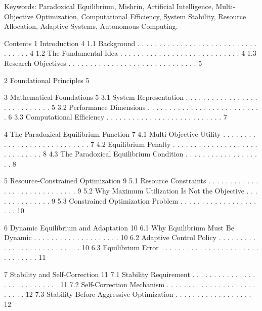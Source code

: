 \documentclass[10pt,a4paper]{article}
\begin{document}
\begin{ManuscriptText}
Keywords: Paradoxical Equilibrium, Mishrin, Artificial Intelligence, Multi-Objective
Optimization, Computational Efficiency, System Stability, Resource Allocation, Adaptive
Systems, Autonomous Computing.


Contents
1 Introduction                                                                          4
  1.1 Background . . . . . . . . . . . . . . . . . . . . . . . . . . . . . . . . . .    4
  1.2 The Fundamental Idea . . . . . . . . . . . . . . . . . . . . . . . . . . . .      4
  1.3 Research Objectives . . . . . . . . . . . . . . . . . . . . . . . . . . . . . .   5

2 Foundational Principles                                                               5

3 Mathematical Foundations                                                               5
  3.1 System Representation . . . . . . . . . . . . . . . . . . . . . . . . . . . .      5
  3.2 Performance Dimensions . . . . . . . . . . . . . . . . . . . . . . . . . . .       6
  3.3 Computational Efficiency . . . . . . . . . . . . . . . . . . . . . . . . . . .     7

4 The Paradoxical Equilibrium Function                                                   7
  4.1 Multi-Objective Utility . . . . . . . . . . . . . . . . . . . . . . . . . . . .    7
  4.2 Equilibrium Penalty . . . . . . . . . . . . . . . . . . . . . . . . . . . . .      8
  4.3 The Paradoxical Equilibrium Condition . . . . . . . . . . . . . . . . . . .        8

5 Resource-Constrained Optimization                                                      9
  5.1 Resource Constraints . . . . . . . . . . . . . . . . . . . . . . . . . . . . .     9
  5.2 Why Maximum Utilization Is Not the Objective . . . . . . . . . . . . . .           9
  5.3 Constrained Optimization Problem . . . . . . . . . . . . . . . . . . . . .        10

6 Dynamic Equilibrium and Adaptation                                                    10
  6.1 Why Equilibrium Must Be Dynamic . . . . . . . . . . . . . . . . . . . .           10
  6.2 Adaptive Control Policy . . . . . . . . . . . . . . . . . . . . . . . . . . .     10
  6.3 Equilibrium Error . . . . . . . . . . . . . . . . . . . . . . . . . . . . . . .   11

7 Stability and Self-Correction                                                         11
  7.1 Stability Requirement . . . . . . . . . . . . . . . . . . . . . . . . . . . .     11
  7.2 Self-Correction Mechanism . . . . . . . . . . . . . . . . . . . . . . . . . .     12
  7.3 Stability Before Aggressive Optimization . . . . . . . . . . . . . . . . . .      12


\end{ManuscriptText}
\end{document}
